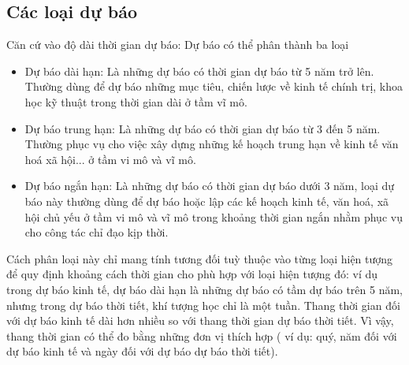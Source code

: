 \subsection{Các loại dự báo}
Căn cứ vào độ dài thời gian dự báo: Dự báo có thể phân thành ba loại
\begin{itemize}
    \item Dự báo dài hạn: Là những dự báo có thời gian dự báo từ 5 năm trở lên. Thường dùng để dự báo những mục tiêu, chiến lược về kinh tế chính trị, khoa học kỹ thuật trong thời gian dài ở tầm vĩ mô. \\
    \item Dự báo trung hạn: Là những dự báo có thời gian dự báo từ 3 đến 5 năm. Thường phục vụ cho việc xây dựng những kế hoạch trung hạn về kinh tế văn hoá xã hội... ở tầm vi mô và vĩ mô. \\
    \item Dự báo ngắn hạn: Là những dự báo có thời gian dự báo dưới 3 năm, loại dự báo này thường dùng để dự báo hoặc lập các kế hoạch kinh tế, văn hoá, xã hội chủ yếu ở tầm vi mô và vĩ mô trong khoảng thời gian ngắn nhằm phục vụ cho công tác chỉ đạo kịp thời. \\
\end{itemize}
Cách phân loại này chỉ mang tính tương đối tuỳ thuộc vào từng loại hiện tượng để quy định khoảng cách thời gian cho phù hợp với loại hiện tượng đó: ví dụ trong dự báo kinh tế, dự báo dài hạn là những dự báo có tầm dự báo trên 5 năm, nhưng trong dự báo thời tiết, khí tượng học chỉ là một tuần. Thang thời gian đối với dự báo kinh tế dài hơn nhiều so với thang
thời gian dự báo thời tiết. Vì vậy, thang thời gian có thể đo bằng những đơn vị thích hợp ( ví dụ: quý, năm đối với dự báo kinh tế và ngày đối với dự báo dự báo thời tiết).


